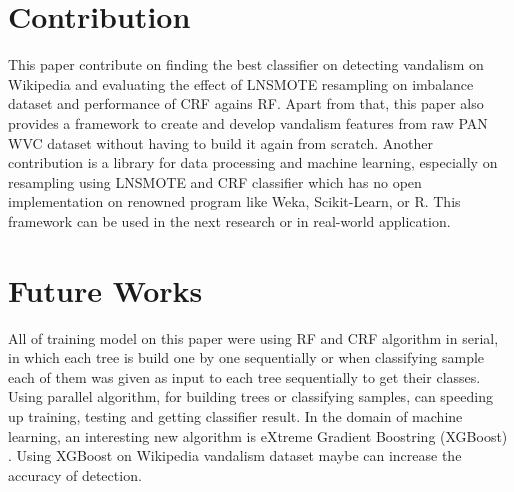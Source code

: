 \section{Contribution}

This paper contribute on finding the best classifier on detecting vandalism on
Wikipedia and evaluating the effect of LNSMOTE resampling on imbalance dataset
and performance of CRF agains RF.
Apart from that, this paper also provides a framework to create and develop
vandalism features from raw PAN WVC dataset without having to build it again
from scratch.
Another contribution is a library for data processing and machine learning,
especially on resampling using LNSMOTE and CRF classifier which has no
open implementation on renowned program like Weka, Scikit-Learn, or R.
This framework can be used in the next research or in real-world application.

\section{Future Works}

All of training model on this paper were using RF and CRF algorithm in serial,
in which each tree is build one by one sequentially or when classifying sample
each of them was given as input to each tree sequentially to get their classes.
Using parallel algorithm, for building trees or classifying samples, can
speeding up training, testing and getting classifier result.
In the domain of machine learning, an interesting new algorithm is eXtreme
Gradient Boostring (XGBoost)
\cite{chen2016xgboost}.
Using XGBoost on Wikipedia vandalism dataset maybe can increase the accuracy
of detection.





